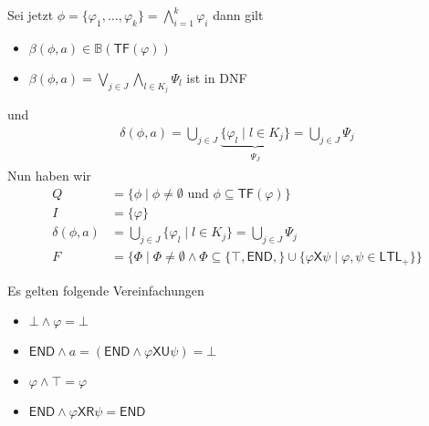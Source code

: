 \documentclass[12pt, german]{article}
\newcommand{\B}{\mathbb{B}}
\newcommand{\ltl}{\mathsf{LTL}}
\newcommand{\sX}{\mathsf{X}}
\newcommand{\sU}{\mathsf{U}}
\newcommand{\sR}{\mathsf{R}}
\newcommand{\sende}{\mathsf{END}}
\newcommand{\tf}{\mathsf{TF}}
\begin{document}
Sei jetzt $\phi = \{\varphi_1, \ldots, \varphi_k\} = \bigwedge_{i = 1}^k \varphi_i$ dann gilt 
\begin{itemize}
	\item$\beta(\phi, a) \in \B(\tf(\varphi))$
	\item $\beta(\phi, a) = \bigvee_{j \in J} \bigwedge_{l \in K_j}\Psi_l$ ist in DNF
\end{itemize} und 
\begin{align*}
	\delta(\phi, a) = \bigcup_{j \in J} \underbrace{\{\varphi_l \mid l \in K_j\} }_{\substack{\Psi_J}}= \bigcup_{j\in J} \Psi_j
\end{align*}
	Nun haben wir 
	\begin{align*}
		Q &= \{\phi \mid \phi \not = \emptyset \text{ und } \phi \subseteq \tf(\varphi)\} \\
		I &= \{\varphi\} \\
		\delta(\phi, a) &= \bigcup_{j \in J} \{\varphi_l \mid l \in K_j\} = \bigcup_{j\in J} \Psi_j \\
		F &= \{\Phi \mid \Phi \not = \emptyset \land \Phi \subseteq \{\top, \sende, \} \cup \{\varphi\sX\psi \mid \varphi, \psi \in \ltl_+\}\}
	\end{align*}
	\newline
	
	Es gelten folgende Vereinfachungen
	\begin{itemize}
		\item $\bot \land \varphi = \bot$
		\item $\sende \land a = (\sende \land \varphi\sX\sU\psi) = \bot$
		\item $\varphi \land \top = \varphi$
		\item $\sende \land \varphi \sX\sR\psi = \sende$
	\end{itemize}
	
\end{document}

